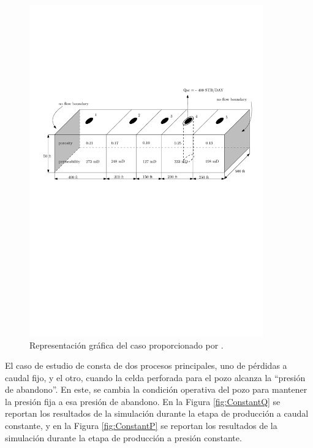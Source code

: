 \begin{figure}[h]
	\centering
	\includegraphics[width=0.9\textwidth]{Fig/casoasis.pdf}
	\caption{Representación gráfica del caso proporcionado por \cite{jamal2006petroleum}.}
	\label{fig:Abou-Kassem}
\end{figure}

El caso de estudio de \cite{jamal2006petroleum} consta de dos procesos principales, uno de pérdidas a caudal fijo, y el otro, cuando la celda perforada para el pozo alcanza la ``presión de abandono''. En este, se cambia la condición operativa del pozo para mantener la presión fija a esa presión de abandono. En la Figura \ref{fig:ConstantQ} se reportan los resultados de la simulación durante la etapa de producción a caudal constante, y en la Figura \ref{fig:ConstantP} se reportan los resultados de la simulación durante la etapa de producción a presión constante.\\





